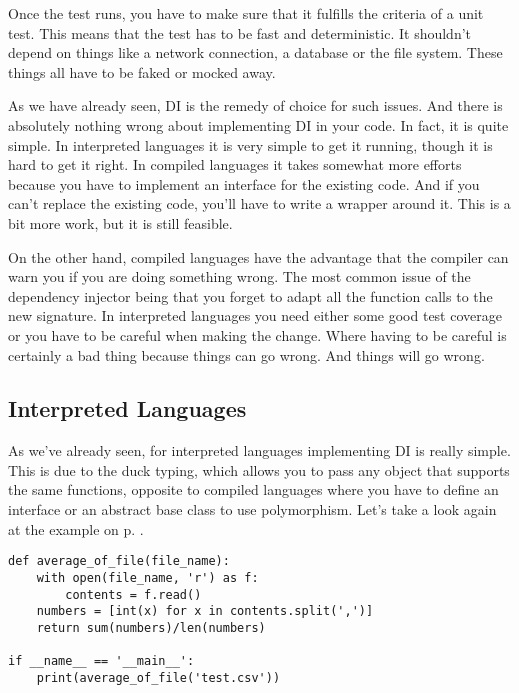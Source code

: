 Once the test runs, you have to make sure that it fulfills the criteria of a unit test. This means that the test has to be fast and deterministic. It shouldn't depend on things like a network connection, a database or the file system. These things all have to be faked or mocked away.

As we have already seen, DI is the remedy of choice for such issues. And there is absolutely nothing wrong about implementing DI in your code. In fact, it is quite simple. In interpreted languages it is very simple to get it running, though it is hard to get it right. In compiled languages it takes somewhat more efforts because you have to implement an interface for the existing code. And if you can't replace the existing code, you'll have to write a wrapper around it. This is a bit more work, but it is still feasible. 

On the other hand, compiled languages have the advantage that the compiler can warn you if you are doing something wrong. The most common issue of the dependency injector being that you forget to adapt all the function calls to the new signature. In interpreted languages you need either some good test coverage or you have to be careful when making the change. Where having to be careful is certainly a bad thing because things can go wrong. And things will go wrong.

\subsection{Interpreted Languages}

As we've already seen, for interpreted languages implementing DI is really simple. This is due to the duck typing, which allows you to pass any object that supports the same functions, opposite to compiled languages where you have to define an interface or an abstract base class to use polymorphism. Let's take a look again at the example on p. \pageref{prog:average_of_file}.

\begin{programcode}{}
\begin{verbatim}
def average_of_file(file_name):
    with open(file_name, 'r') as f:
        contents = f.read()
    numbers = [int(x) for x in contents.split(',')]
    return sum(numbers)/len(numbers)

if __name__ == '__main__':
    print(average_of_file('test.csv'))
\end{verbatim}
\end{programcode}

